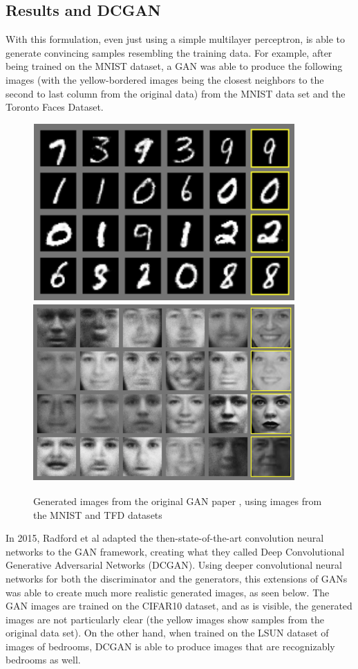\subsection{Results and DCGAN}
With this formulation, even just using a simple multilayer perceptron, is able to generate convincing samples resembling the training data. For example, after being trained on the MNIST dataset, a GAN was able to produce the following images (with the yellow-bordered images being the closest neighbors to the second to last column from the original data) from the MNIST data set and the Toronto Faces Dataset.

\begin{figure}[h]
\centering
  \includegraphics[scale=0.4]{chapter_14/files/gan_mnist.png}
  \includegraphics[scale=0.4]{chapter_14/files/gan_faces.png}
  \caption{Generated images from the original GAN paper \cite{goodfellow2014generative}, using images from the MNIST and TFD datasets}
\end{figure}

In 2015, Radford et al\cite{radford2015unsupervised} adapted the then-state-of-the-art convolution neural networks to the GAN framework, creating what they called Deep Convolutional Generative Adversarial Networks (DCGAN). Using deeper convolutional neural networks for both the discriminator and the generators, this extensions of GANs was able to create much more realistic generated images, as seen below. The GAN images are trained on the CIFAR10 dataset, and as is visible, the generated images are not particularly clear (the yellow images show samples from the original data set). On the other hand, when trained on the LSUN dataset of images of bedrooms, DCGAN is able to produce images that are recognizably bedrooms as well.

